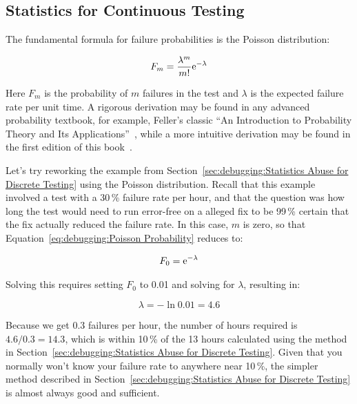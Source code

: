\subsection{Statistics for Continuous Testing}
\label{sec:debuggingStatistics for Continuous Testing}

The fundamental formula for failure probabilities is the Poisson
distribution:

\begin{equation}
	F_m = \frac{\lambda^m}{m!} \mathrm{e}^{-\lambda}
\label{eq:debugging:Poisson Probability}
\end{equation}

Here $F_m$ is the probability of $m$ failures in the test and
$\lambda$ is the expected failure rate per unit time.
A rigorous derivation may be found in any advanced probability
textbook, for example, Feller's classic ``An Introduction to Probability
Theory and Its Applications''~\cite{Feller58}, while a more
intuitive derivation may be found in the first edition of
this book~\cite[Equations 11.8--11.26]{McKenney2014ParallelProgramming-e1}.

Let's try reworking the example from
Section~\ref{sec:debugging:Statistics Abuse for Discrete Testing}
using the Poisson distribution.
Recall that this example involved a test with a 30\,\% failure rate per
hour, and that the question was how long the test would need to run
error-free
on a alleged fix to be 99\,\% certain that the fix actually reduced the
failure rate.
In this case, $m$ is zero, so that
Equation~\ref{eq:debugging:Poisson Probability} reduces to:

\begin{equation}
	F_0 =  \mathrm{e}^{-\lambda}
\end{equation}

Solving this requires setting $F_0$
to 0.01 and solving for $\lambda$, resulting in:

\begin{equation}
	\lambda = - \ln 0.01 = 4.6
\end{equation}

Because we get $0.3$ failures per hour, the number of hours required
is $4.6/0.3 = 14.3$, which is within 10\,\% of the 13 hours
calculated using the method in
Section~\ref{sec:debugging:Statistics Abuse for Discrete Testing}.
Given that you normally won't know your failure rate to anywhere near
10\,\%, the simpler method described in
Section~\ref{sec:debugging:Statistics Abuse for Discrete Testing}
is almost always good and sufficient.

